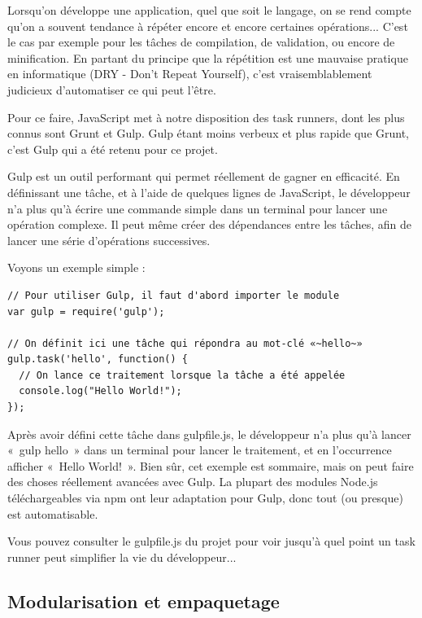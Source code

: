 \documentclass[a4paper,12pt]{article}
\begin{document}
Lorsqu'on développe une application, quel que soit le langage, on se rend compte qu'on a souvent tendance à répéter encore et encore certaines opérations... C'est le cas par exemple pour les tâches de compilation, de validation, ou encore de minification. En partant du principe que la répétition est une mauvaise pratique en informatique (DRY - Don't Repeat Yourself), c'est vraisemblablement judicieux d'automatiser ce qui peut l'être.

Pour ce faire, JavaScript met à notre disposition des task runners, dont les plus connus sont Grunt et Gulp. Gulp étant moins verbeux et plus rapide que Grunt, c'est Gulp qui a été retenu pour ce projet.

Gulp est un outil performant qui permet réellement de gagner en efficacité. En définissant une tâche, et à l'aide de quelques lignes de JavaScript, le développeur n'a plus qu'à écrire une commande simple dans un terminal pour lancer une opération complexe. Il peut même créer des dépendances entre les tâches, afin de lancer une série d'opérations successives.

Voyons un exemple simple :

\begin{lstlisting}
// Pour utiliser Gulp, il faut d'abord importer le module
var gulp = require('gulp');

// On définit ici une tâche qui répondra au mot-clé «~hello~»
gulp.task('hello', function() {
  // On lance ce traitement lorsque la tâche a été appelée
  console.log("Hello World!");
});
\end{lstlisting}

Après avoir défini cette tâche dans gulpfile.js, le développeur n'a plus qu'à lancer «~gulp hello~» dans un terminal pour lancer le traitement, et en l'occurrence afficher «~Hello World!~». Bien sûr, cet exemple est sommaire, mais on peut faire des choses réellement avancées avec Gulp. La plupart des modules Node.js téléchargeables via npm ont leur adaptation pour Gulp, donc tout (ou presque) est automatisable. 

Vous pouvez consulter le gulpfile.js du projet pour voir jusqu'à quel point un task runner peut simplifier la vie du développeur...

\subsection{Modularisation et empaquetage}
\end{document}
